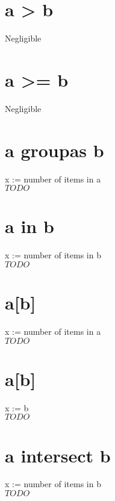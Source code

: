 \documentclass[12pt]{article}
\begin{document}
	\section{a > b}
	Negligible
	
	\section{a >= b}
	Negligible
	
	\section{a groupas b}
	x := number of items in a\\
	$TODO$
	
	\section{a in b}
	x := number of items in b\\
	$TODO$
	
	\section{a[b]}
	x := number of items in a\\
	$TODO$
	
	\section{a[b]}
	x := b\\
	$TODO$
	
	\section{a intersect b}
	x := number of items in b\\
	$TODO$
\end{document}
